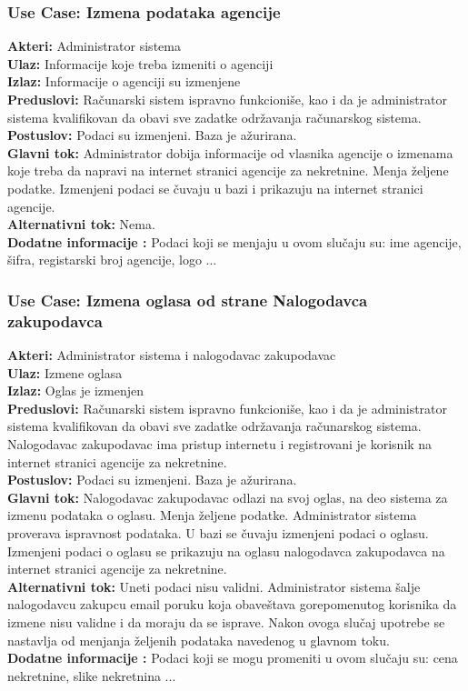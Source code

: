 \documentclass{article}
\begin{document}
\subsubsection{\bfseries Use Case: Izmena podataka agencije}
{\bfseries Akteri:} Administrator sistema\\
{\bfseries Ulaz:} Informacije koje treba izmeniti o agenciji\\
{\bfseries Izlaz:} Informacije o agenciji su izmenjene\\
{\bfseries Preduslovi:} Ra\v {c}unarski sistem ispravno funkcioni\v {s}e, kao i da je administrator sistema kvalifikovan da obavi sve zadatke odr\v {z}avanja ra\v {c}unarskog sistema.\\
{\bfseries Postuslov:} Podaci su izmenjeni. Baza je a\v {z}urirana.\\
{\bfseries Glavni tok:} Administrator dobija informacije od vlasnika agencije o izmenama koje treba da napravi na internet stranici agencije za nekretnine. Menja \v {z}eljene podatke. Izmenjeni podaci se \v {c}uvaju u bazi i prikazuju na internet stranici agencije.\\
{\bfseries Alternativni tok:} Nema.\\
{\bfseries Dodatne informacije :} Podaci koji se menjaju u ovom slu\v {c}aju su: ime agencije, \v {s}ifra, registarski broj agencije, logo ...\\
\subsubsection{\bfseries Use Case: Izmena oglasa od strane Nalogodavca zakupodavca}
{\bfseries Akteri:} Administrator sistema i nalogodavac zakupodavac\\
{\bfseries Ulaz:} Izmene oglasa\\
{\bfseries Izlaz:} Oglas je izmenjen\\
{\bfseries Preduslovi:} Ra\v {c}unarski sistem ispravno funkcioni\v {s}e, kao i da je administrator sistema kvalifikovan da obavi sve zadatke odr\v {z}avanja ra\v {c}unarskog sistema. Nalogodavac zakupodavac ima pristup internetu i registrovani je korisnik na internet stranici agencije za nekretnine.\\
{\bfseries Postuslov:} Podaci su izmenjeni. Baza je a\v {z}urirana.\\
{\bfseries Glavni tok:} Nalogodavac zakupodavac odlazi na svoj oglas, na deo sistema za izmenu podataka o oglasu. Menja \v {z}eljene podatke. Administrator sistema proverava ispravnost podataka. U bazi se \v {c}uvaju izmenjeni podaci o oglasu. Izmenjeni podaci o oglasu se prikazuju na oglasu nalogodavca zakupodavca na internet stranici agencije za nekretnine.\\
{\bfseries Alternativni tok:} Uneti podaci nisu validni. Administrator sistema \v {s}alje nalogodavcu zakupcu email poruku koja obave\v {s}tava gorepomenutog korisnika da izmene nisu validne i da moraju da se isprave. Nakon ovoga slu\v {c}aj upotrebe se nastavlja od menjanja \v {z}eljenih podataka navedenog u glavnom toku.\\
{\bfseries Dodatne informacije :} Podaci koji se mogu promeniti u ovom slu\v {c}aju su: cena nekretnine, slike nekretnina ...\\
\end{document}

